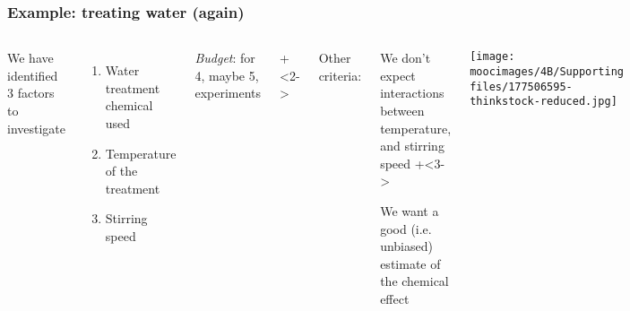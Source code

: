\documentclass[handout,11pt,aspectratio=169,mathserif]{beamer}
\begin{document}
\begin{frame}\frametitle{Example: treating water (again)}
	
	\begin{columns}[T]
			We have identified 3 factors to investigate
			\begin{enumerate}
				\item	Water treatment chemical used
				\item	Temperature of the treatment
				\item	Stirring speed
			\end{enumerate}
		
			\vspace{1cm}
			\emph{Budget}: for 4, maybe 5, experiments
			
			\onslide+<2->{
				\vspace{1cm}
				Other criteria:
				\begin{itemize}
					\item	We don't expect interactions between temperature, and stirring speed
					\onslide+<3->{
						\item	We want a good (i.e. unbiased) estimate of the chemical effect
					}
				\end{itemize}
			}
			
		
			\texttt{[image: \\moocimages/4B/Supporting files/177506595-thinkstock-reduced.jpg]}
		
		
			
	\end{columns}
\end{frame}
\end{document}
